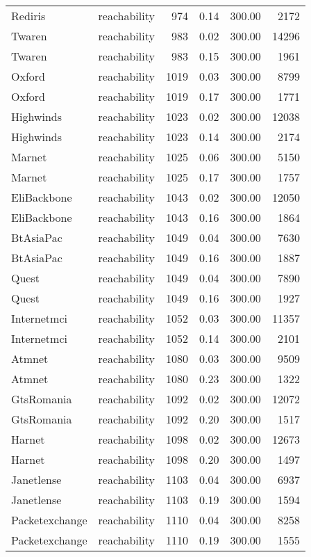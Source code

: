 \begin{tabular}{llrrrr}
Rediris & reachability & 974 & 0.14 & 300.00 & 2172 \\
Twaren & reachability & 983 & 0.02 & 300.00 & 14296 \\
Twaren & reachability & 983 & 0.15 & 300.00 & 1961 \\
Oxford & reachability & 1019 & 0.03 & 300.00 & 8799 \\
Oxford & reachability & 1019 & 0.17 & 300.00 & 1771 \\
Highwinds & reachability & 1023 & 0.02 & 300.00 & 12038 \\
Highwinds & reachability & 1023 & 0.14 & 300.00 & 2174 \\
Marnet & reachability & 1025 & 0.06 & 300.00 & 5150 \\
Marnet & reachability & 1025 & 0.17 & 300.00 & 1757 \\
EliBackbone & reachability & 1043 & 0.02 & 300.00 & 12050 \\
EliBackbone & reachability & 1043 & 0.16 & 300.00 & 1864 \\
BtAsiaPac & reachability & 1049 & 0.04 & 300.00 & 7630 \\
BtAsiaPac & reachability & 1049 & 0.16 & 300.00 & 1887 \\
Quest & reachability & 1049 & 0.04 & 300.00 & 7890 \\
Quest & reachability & 1049 & 0.16 & 300.00 & 1927 \\
Internetmci & reachability & 1052 & 0.03 & 300.00 & 11357 \\
Internetmci & reachability & 1052 & 0.14 & 300.00 & 2101 \\
Atmnet & reachability & 1080 & 0.03 & 300.00 & 9509 \\
Atmnet & reachability & 1080 & 0.23 & 300.00 & 1322 \\
GtsRomania & reachability & 1092 & 0.02 & 300.00 & 12072 \\
GtsRomania & reachability & 1092 & 0.20 & 300.00 & 1517 \\
Harnet & reachability & 1098 & 0.02 & 300.00 & 12673 \\
Harnet & reachability & 1098 & 0.20 & 300.00 & 1497 \\
Janetlense & reachability & 1103 & 0.04 & 300.00 & 6937 \\
Janetlense & reachability & 1103 & 0.19 & 300.00 & 1594 \\
Packetexchange & reachability & 1110 & 0.04 & 300.00 & 8258 \\
Packetexchange & reachability & 1110 & 0.19 & 300.00 & 1555 \\

\end{tabular}
